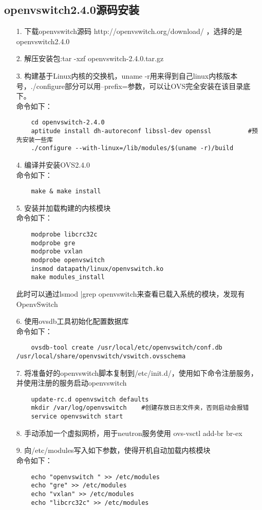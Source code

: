 \documentclass[a4paper,left=1.5cm,right=1.5cm,11pt]{article}
\begin{document}
\subsection{openvswitch2.4.0源码安装}
\begin{itemize}
    \item[1.]下载openvswitch源码 http://openvswitch.org/download/ ，选择的是openvswitch2.4.0
	\item[2.]解压安装包:tar -xzf openvswitch-2.4.0.tar.gz
	\item[3.]构建基于Linux内核的交换机，uname -r用来得到自己linux内核版本号，./configure部分可以用--prefix=参数，可以让OVS完全安装在该目录底下。\\
	命令如下：
	\begin{lstlisting}
	cd openvswitch-2.4.0
	aptitude install dh-autoreconf libssl-dev openssl          #预先安装一些库
	./configure --with-linux=/lib/modules/$(uname -r)/build
	\end{lstlisting}
	\item[4.]编译并安装OVS2.4.0\\
	命令如下：
	\begin{lstlisting}
	make & make install
	\end{lstlisting}
	\item[5.]安装并加载构建的内核模块\\
	命令如下：
	\begin{lstlisting}
	modprobe libcrc32c
	modprobe gre
	modprobe vxlan
	modprobe openvswitch
	insmod datapath/linux/openvswitch.ko
	make modules_install
    \end{lstlisting}
    此时可以通过lsmod |grep openvswitch来查看已载入系统的模块，发现有OpenvSwitch
	\item[6.]使用ovsdb工具初始化配置数据库\\
	命令如下：
	\begin{lstlisting}
	ovsdb-tool create /usr/local/etc/openvswitch/conf.db /usr/local/share/openvswitch/vswitch.ovsschema
    \end{lstlisting}
	\item[7.]将准备好的openvswitch脚本复制到/etc/init.d/，使用如下命令注册服务，并使用注册的服务启动openvswitch
	\begin{lstlisting}
	update-rc.d openvswitch defaults
	mkdir /var/log/openvswitch    #创建存放日志文件夹，否则启动会报错
	service openvswitch start 
	\end{lstlisting}
	\item[8.]手动添加一个虚拟网桥，用于neutron服务使用
	ovs-vsctl add-br br-ex
	\item[9.]向/etc/modules写入如下参数，使得开机自动加载内核模块\\
	命令如下：
	\begin{lstlisting}
	echo "openvswitch " >> /etc/modules
	echo "gre" >> /etc/modules
	echo "vxlan" >> /etc/modules
	echo "libcrc32c" >> /etc/modules
	\end{lstlisting}
\end{itemize}
\end{document}

